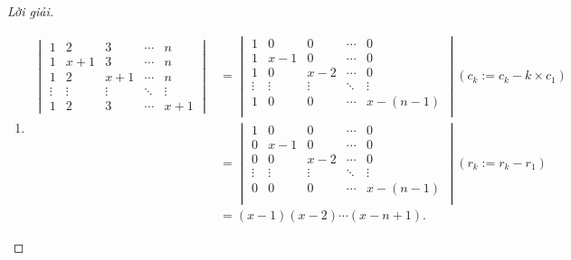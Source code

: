 \begin{proof}[Lời giải]
    \begin{enumerate}[label = (\alph*)]
        \item
              \begin{align*}
                  \begin{vmatrix}
                      1      & 2      & 3      & \cdots & n      \\
                      1      & x + 1  & 3      & \cdots & n      \\
                      1      & 2      & x + 1  & \cdots & n      \\
                      \vdots & \vdots & \vdots & \ddots & \vdots \\
                      1      & 2      & 3      & \cdots & x + 1
                  \end{vmatrix}
                   & =
                  \begin{vmatrix}
                      1      & 0      & 0      & \cdots & 0           \\
                      1      & x - 1  & 0      & \cdots & 0           \\
                      1      & 0      & x - 2  & \cdots & 0           \\
                      \vdots & \vdots & \vdots & \ddots & \vdots      \\
                      1      & 0      & 0      & \cdots & x - (n - 1) \\
                  \end{vmatrix} (c_{k}:= c_{k} - k\times c_{1}) \\
                   & =
                  \begin{vmatrix}
                      1      & 0      & 0      & \cdots & 0           \\
                      0      & x - 1  & 0      & \cdots & 0           \\
                      0      & 0      & x - 2  & \cdots & 0           \\
                      \vdots & \vdots & \vdots & \ddots & \vdots      \\
                      0      & 0      & 0      & \cdots & x - (n - 1) \\
                  \end{vmatrix} (r_{k}:= r_{k} - r_{1}) \\
                   & = (x - 1)(x - 2)\cdots (x - n + 1).
              \end{align*}

\end{enumerate}
\end{proof}
